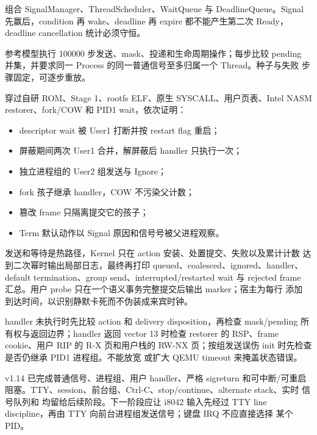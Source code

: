 组合 SignalManager、ThreadScheduler、WaitQueue 与 DeadlineQueue。Signal
先赢后，condition 再 wake、deadline 再 expire 都不能产生第二次 Ready，
deadline cancellation 统计必须守恒。

参考模型执行 100000 步发送、mask、投递和生命周期操作；每步比较 pending
并集，并要求同一 Process 的同一普通信号至多归属一个 Thread。种子与失败
步骤固定，可逐步重放。

 穿过自研 ROM、Stage 1、rootfs ELF、原生
SYSCALL、用户页表、Intel NASM restorer、fork/COW 和 PID1 wait，依次证明：

\begin{itemize}
  \item descriptor wait 被 User1 打断并按 restart flag 重启；
  \item 屏蔽期间两次 User1 合并，解屏蔽后 handler 只执行一次；
  \item 独立进程组的 User2 组发送与 Ignore；
  \item fork 孩子继承 handler，COW 不污染父计数；
  \item 篡改 frame 只隔离提交它的孩子；
  \item Term 默认动作以 Signal 原因和信号号被父进程观察。
\end{itemize}

发送和等待是热路径，Kernel 只在 action 安装、处置提交、失败以及累计计数
达到二次幂时输出局部日志，最终再打印 queued、coalesced、ignored、handler、
default termination、group send、interrupted/restarted wait 与 rejected
frame 汇总。用户 probe 只在一个语义事务完整提交后输出 marker；宿主为每行
添加 \code{[QEMU][T+...ms]} 到达时间，以识别静默卡死而不伪装成来宾时钟。

handler 未执行时先比较 action 和 delivery disposition，再检查 mask/pending
所有权与返回边界；handler 返回 vector 13 时检查 restorer 的 RSP、frame
cookie、用户 RIP 的 R-X 页和用户栈的 RW-NX 页；按组发送误伤 init 时先检查
是否仍继承 PID1 进程组。不能放宽  或扩大 QEMU
timeout 来掩盖状态错误。

v1.14 已完成普通信号、进程组、用户 handler、严格 sigreturn 和可中断/可重启
阻塞。TTY、session、前台组、Ctrl-C、stop/continue、alternate stack、实时
信号队列和  均留给后续阶段。下一阶段应让 i8042 输入先经过
TTY line discipline，再由 TTY 向前台进程组发送信号；键盘 IRQ 不应直接选择
某个 PID。
